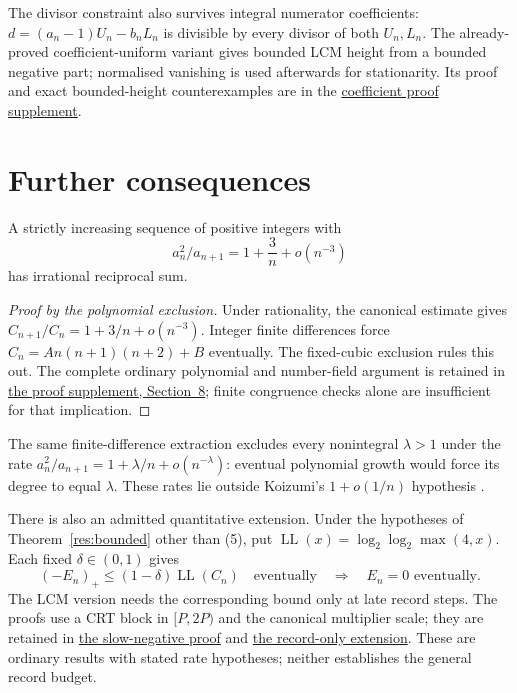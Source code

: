 \documentclass[11pt]{article}
\begin{document}
The divisor constraint also survives integral numerator coefficients:
$d=(a_n-1)U_n-b_nL_n$ is divisible by every divisor of both $U_n,L_n$.
The already-proved coefficient-uniform variant gives bounded LCM height
from a bounded negative part; normalised vanishing is used afterwards for
stationarity. Its proof and exact bounded-height counterexamples are in the
\href{\repobase/\PX/Erdos243/CoefficientUniformBoundedHeight.md}
{coefficient proof supplement}.

\section{Further consequences}\label{sec:secondaryrate}
\begin{theorem}\label{res:cubicrate}
A strictly increasing sequence of positive integers with
\[
 a_n^2/a_{n+1}=1+\frac3n+o(n^{-3})
\]
has irrational reciprocal sum.
\end{theorem}
\begin{proof}[Proof by the polynomial exclusion]
Under rationality, the canonical estimate gives
$C_{n+1}/C_n=1+3/n+o(n^{-3})$. Integer finite differences force
$C_n=An(n+1)(n+2)+B$ eventually. The fixed-cubic exclusion rules this out.
The complete ordinary polynomial and number-field argument is retained in
\href{\repobase/\PX/Erdos243/WeightedRecordOctupleCriteria.md\#8-rising-factorial-cubic-profiles-and-the-cubic-rate-irrationality-r08}
{the proof supplement, Section~8}; finite congruence checks alone are
insufficient for that implication.
\end{proof}

The same finite-difference extraction excludes every nonintegral
$\lambda>1$ under the rate
$a_n^2/a_{n+1}=1+\lambda/n+o(n^{-\lambda})$: eventual polynomial growth
would force its degree to equal $\lambda$. These rates lie outside
Koizumi's $1+o(1/n)$ hypothesis \cite[Remark~3]{koizumi2025}.

There is also an admitted quantitative extension. Under the hypotheses of
Theorem~\ref{res:bounded} other than (5), put
$\operatorname{LL}(x)=\log_2\log_2\max(4,x)$. Each fixed
$\delta\in(0,1)$ gives
\[
 (-E_n)_+\le(1-\delta)\operatorname{LL}(C_n)
 \quad\text{eventually}\quad\Longrightarrow\quad E_n=0\text{ eventually}.
\]
The LCM version needs the corresponding bound only at late record steps.
The proofs use a CRT block in $[P,2P)$ and the canonical multiplier scale;
they are retained in
\href{\repobase/\PX/Erdos243/SlowNegativePartRigidity.md}{the slow-negative proof}
and \href{\repobase/\PX/Erdos243/LcmRecordExcess.md\#5-record-only-subcritical-log-log-bound}
{the record-only extension}. These are ordinary results with stated rate
hypotheses; neither establishes the general record budget.
\end{document}
